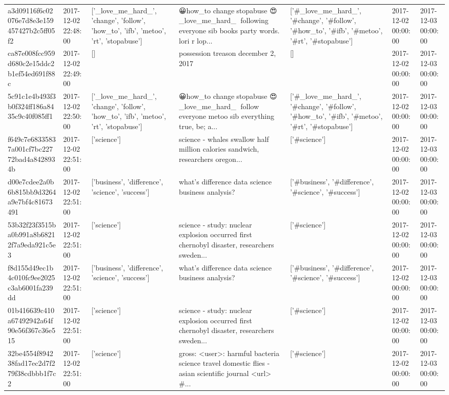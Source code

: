 \begin{tabular}{lllllll}
a3d09116f6c02076e7d8e3e159457427b2c5ff05f2 & 2017-12-02 22:48:00 & ['_love_me_hard_', 'change', 'follow', 'how_to', 'ifb', 'metoo', 'rt', 'stopabuse'] & 😀how\_to change🌹stopabuse 😍\_love\_me\_hard\_🌹 following everyone sib books party words. lori r lop... & ['#_love_me_hard_', '#change', '#follow', '#how_to', '#ifb', '#metoo', '#rt', '#stopabuse'] & 2017-12-02 00:00:00 & 2017-12-03 00:00:00 \\
ca87e008fcc959d680c2e15ddc2b1ef54ed691f88c & 2017-12-02 22:49:00 & [] & possession treason december 2, 2017 & [] & 2017-12-02 00:00:00 & 2017-12-03 00:00:00 \\
5c91c1e4b493f3b0f324ff186a8435c9c40f085ff1 & 2017-12-02 22:50:00 & ['_love_me_hard_', 'change', 'follow', 'how_to', 'ifb', 'metoo', 'rt', 'stopabuse'] & 😀how\_to change🌹stopabuse 😍\_love\_me\_hard\_🌹 follow everyone metoo sib everything true, be; a... & ['#_love_me_hard_', '#change', '#follow', '#how_to', '#ifb', '#metoo', '#rt', '#stopabuse'] & 2017-12-02 00:00:00 & 2017-12-03 00:00:00 \\
f649c7e68335837a001cf7bc22772bad4a8428934b & 2017-12-02 22:51:00 & ['science'] & science - whales swallow half million calories sandwich, researchers oregon... & ['#science'] & 2017-12-02 00:00:00 & 2017-12-03 00:00:00 \\
d00e7cdee2a0b6b815bb9d3264a9e7bf4c81673491 & 2017-12-02 22:51:00 & ['business', 'difference', 'science', 'success'] & what's difference data science business analysis? & ['#business', '#difference', '#science', '#success'] & 2017-12-02 00:00:00 & 2017-12-03 00:00:00 \\
53b32f23f3515ba0b991a8b68212f7a9eda921c5e3 & 2017-12-02 22:51:00 & ['science'] & science - study: nuclear explosion occurred first chernobyl disaster, researchers sweden... & ['#science'] & 2017-12-02 00:00:00 & 2017-12-03 00:00:00 \\
f8d155d49ec1b4c010fc9ee2025c3ab6001fa239dd & 2017-12-02 22:51:00 & ['business', 'difference', 'science', 'success'] & what's difference data science business analysis? & ['#business', '#difference', '#science', '#success'] & 2017-12-02 00:00:00 & 2017-12-03 00:00:00 \\
01b416639c410a67492942a64f90e56f367c36e515 & 2017-12-02 22:51:00 & ['science'] & science - study: nuclear explosion occurred first chernobyl disaster, researchers sweden... & ['#science'] & 2017-12-02 00:00:00 & 2017-12-03 00:00:00 \\
32be4554f894238fad17ec2d7f279f38cdbbb1f7c2 & 2017-12-02 22:51:00 & ['science'] & gross: <user>: harmful bacteria science travel domestic flies - asian scientific journal <url> \#... & ['#science'] & 2017-12-02 00:00:00 & 2017-12-03 00:00:00 \\

\end{tabular}
